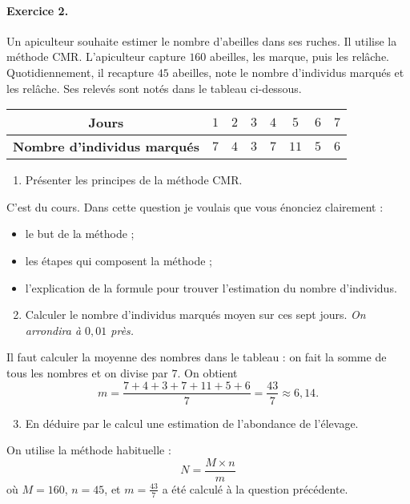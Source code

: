 \documentclass[11pt]{article}
\begin{document}
\paragraph{Exercice 2.} Un apiculteur souhaite estimer le nombre d'abeilles dans
ses ruches. Il utilise la méthode CMR. L'apiculteur capture $160$ abeilles, les
marque, puis les rel\^ache. Quotidiennement, il recapture $45$ abeilles, note le
nombre d'individus marqués et les rel\^ache. Ses relevés sont notés dans le
tableau ci-dessous.
\begin{center}
  \renewcommand{\arraystretch}{1.2}
  \begin{tabular}[]{|c|c|c|c|c|c|c|c|}
    \hline
    \textbf{Jours} & $1$ & $2$ & $3$ & $4$ & $5$ & $6$ & $7$ \\
    \hline
    \textbf{Nombre d'individus marqués} & $7$ & $4$ & $3$ & $7$ & $11$ & $5$ &
    $6$ \\
    \hline
  \end{tabular}
\end{center}
\begin{enumerate}
  \item Présenter les principes de la méthode CMR.
\end{enumerate}
C'est du cours. Dans cette question je voulais que vous énonciez clairement : 
\begin{itemize}
  \item le but de la méthode ;
  \item les étapes qui composent la m\'ethode ;
  \item l'explication de la formule pour trouver l'estimation du nombre
    d'individus.
\end{itemize}
\begin{enumerate}
    \setcounter{enumi}{1}
  \item Calculer le nombre d'individus marqués moyen sur ces sept jours.
    \emph{On arrondira à $0,01$ près.}
\end{enumerate}
Il faut calculer la moyenne des nombres dans le tableau : on fait la somme de
tous les nombres et on divise par $7$. On obtient
\[
  m=\frac{7+4+3+7+11+5+6}{7}=\frac{43}{7}\approx6,14.
\]
\begin{enumerate}
    \setcounter{enumi}{2}
  \item En déduire par le calcul une estimation de l'abondance de l'élevage.
\end{enumerate}
On utilise la méthode habituelle :
\[
  N = \frac{M\times n}{m}
\]
où $M=160$, $n=45$, et $m=\frac{43}{7}$ a été calculé à la question précédente.
\end{document}
